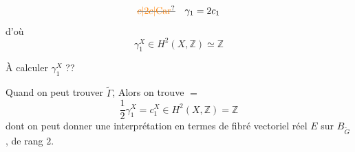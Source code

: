 \[
\deleted{\unsure{c|2c|\text{Car}}}\quad\gamma_1=2c_1
\]
d'où
\[
\boxed{\gamma_1^X\in H^2(X,\mathbb Z)\simeq\boxed{\mathbb Z}}
\]

À calculer $\gamma_1^X$ ??

 Quand on peut trouver $\widetilde\Gamma$,
Alors on trouve $=$
\[
\boxed{\frac12\gamma_1^X=c_1^X\in H^2(X,\mathbb Z)=\mathbb Z}
\]
dont on peut donner une interprétation en termes  de fibré vectoriel réel $E$ sur $B_{\widetilde G}$, de rang $2$.

